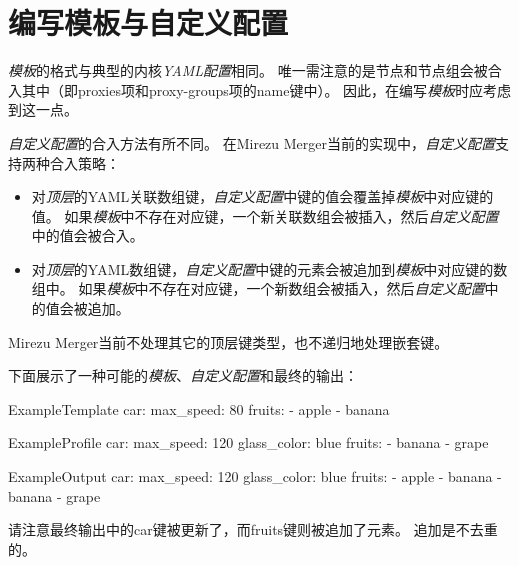 \documentclass[a4paper,fontset=founder,punct=kaiming]{ctexart}
\renewcommand\_{\textunderscore\linebreak[1]}
\newcommand{\productname}{Mirezu Merger}
\begin{document}
\section{编写模板与自定义配置}
\label{sec:template}

\emph{模板}的格式与典型的内核\emph{YAML配置}相同。
唯一需注意的是节点和节点组会被合入其中（即proxies项和proxy-groups项的name键中）。
因此，在编写\emph{模板}时应考虑到这一点。

\emph{自定义配置}的合入方法有所不同。
在\productname 当前的实现中，\emph{自定义配置}支持两种合入策略：
\begin{itemize}
\item 对\emph{顶层}的YAML关联数组键，\emph{自定义配置}中键的值会覆盖掉\emph{模板}中对应键的值。
  如果\emph{模板}中不存在对应键，一个新关联数组会被插入，然后\emph{自定义配置}中的值会被合入。
\item 对\emph{顶层}的YAML数组键，\emph{自定义配置}中键的元素会被追加到\emph{模板}中对应键的数组中。
  如果\emph{模板}中不存在对应键，一个新数组会被插入，然后\emph{自定义配置}中的值会被追加。
\end{itemize}
\productname 当前不处理其它的顶层键类型，也不递归地处理嵌套键。

下面展示了一种可能的\emph{模板}、\emph{自定义配置}和最终的输出：

\noindent
\begin{SaveVerbatim}{ExampleTemplate}
car:
  max_speed: 80
fruits:
- apple
- banana
\end{SaveVerbatim}
\begin{SaveVerbatim}{ExampleProfile}
car:
  max_speed: 120
  glass_color: blue
fruits:
- banana
- grape
\end{SaveVerbatim}
\begin{SaveVerbatim}{ExampleOutput}
car:
  max_speed: 120
  glass_color: blue
fruits:
- apple
- banana
- banana
- grape
\end{SaveVerbatim}
\hspace{\fill}
\hspace{\fill}

\bigskip
请注意最终输出中的car键被更新了，而fruits键则被追加了元素。
追加是不去重的。
\end{document}
